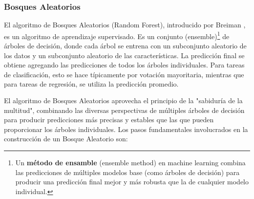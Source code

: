 \subsubsection{Bosques Aleatorios}
El algoritmo de Bosques Aleatorios (Random Forest), introducido por Breiman \cite{breiman2001random}, es un algoritmo de aprendizaje supervisado.
Es un conjunto (ensemble)\footnote{Un \textbf{método de ensamble} (ensemble method) en machine learning combina las predicciones de múltiples modelos base (como árboles de decisión) para producir una predicción final mejor y más robusta que la de cualquier modelo individual.} de árboles de decisión, donde cada árbol se entrena con un subconjunto aleatorio de los datos y un subconjunto aleatorio de las características.
La predicción final se obtiene agregando las predicciones de todos los árboles individuales.
Para tareas de clasificación, esto se hace típicamente por votación mayoritaria, mientras que para tareas de regresión, se utiliza la predicción promedio.

El algoritmo de Bosques Aleatorios aprovecha el principio de la "sabiduría de la multitud", combinando las diversas perspectivas de múltiples árboles de decisión para producir predicciones más precisas y estables que las que pueden proporcionar los árboles individuales.
Los pasos fundamentales involucrados en la construcción de un Bosque Aleatorio son:

